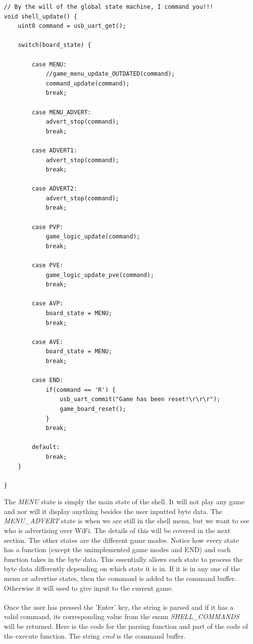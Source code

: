 \documentclass[a4paper, 12pt]{article}
\begin{document}
    \begin{verbatim}
// By the will of the global state machine, I command you!!!
void shell_update() {
    uint8 command = usb_uart_get();
    
    switch(board_state) {
            
        case MENU: 
            //game_menu_update_OUTDATED(command);
            command_update(command);
            break;
            
        case MENU_ADVERT:
            advert_stop(command);
            break;
            
        case ADVERT1:
            advert_stop(command);
            break;
            
        case ADVERT2:
            advert_stop(command);
            break;
        
        case PVP:
            game_logic_update(command);            
            break;
        
        case PVE:
            game_logic_update_pve(command);
            break;
        
        case AVP:
            board_state = MENU;
            break;
        
        case AVE:
            board_state = MENU;
            break;
            
        case END:
            if(command == 'R') {
                usb_uart_commit("Game has been reset!\r\r\r");
                game_board_reset();
            }
            break;           
        
        default: 
            break;
    }
    
}
    \end{verbatim}

    The \textit{MENU} state is simply the main state of the shell. It will not
    play any game and nor will it display anything besides the user inputted
    byte data. The \textit{MENU\_ADVERT} state is when we are still in the shell
    menu, but we want to see who is advertising over WiFi. The details of this
    will be covered in the next section. The other states are the different
    game modes. Notice how every state has a function (except the 
    unimplemented game modes and END) and each function takes in the byte
    data. This essentially allows each state to process the byte data 
    differently depending on which state it is in. If it is in any one of the
    menu or advertise states, then the command is added to the command buffer.
    Otherwise it will used to give input to the current game.
    \\ \\
    Once the user has pressed the 'Enter' key, the string is parsed and if it
    has a valid command, its corresponding value from the enum
    \textit{SHELL\_COMMANDS} will be returned. Here is the code for the parsing
    function and part of the code of the execute function. The string
    \textit{cmd} is the command buffer.
\end{document}
